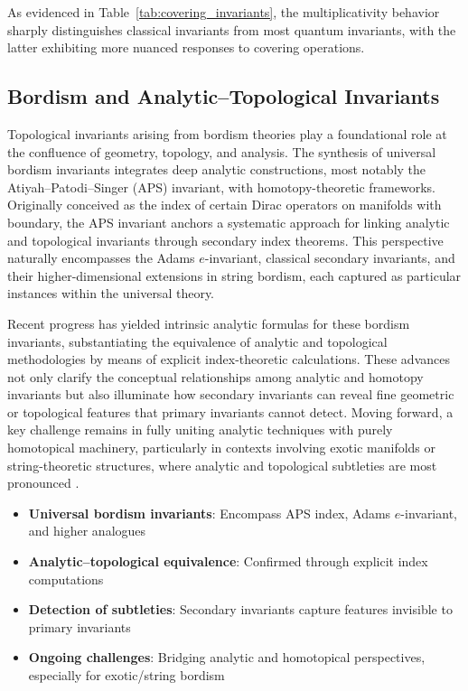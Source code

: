 As evidenced in Table~\ref{tab:covering_invariants}, the multiplicativity behavior sharply distinguishes classical invariants from most quantum invariants, with the latter exhibiting more nuanced responses to covering operations.

\subsection{Bordism and Analytic–Topological Invariants}

Topological invariants arising from bordism theories play a foundational role at the confluence of geometry, topology, and analysis. The synthesis of universal bordism invariants integrates deep analytic constructions, most notably the Atiyah–Patodi–Singer (APS) invariant, with homotopy-theoretic frameworks. Originally conceived as the index of certain Dirac operators on manifolds with boundary, the APS invariant anchors a systematic approach for linking analytic and topological invariants through secondary index theorems. This perspective naturally encompasses the Adams $e$-invariant, classical secondary invariants, and their higher-dimensional extensions in string bordism, each captured as particular instances within the universal theory.

Recent progress has yielded intrinsic analytic formulas for these bordism invariants, substantiating the equivalence of analytic and topological methodologies by means of explicit index-theoretic calculations. These advances not only clarify the conceptual relationships among analytic and homotopy invariants but also illuminate how secondary invariants can reveal fine geometric or topological features that primary invariants cannot detect. Moving forward, a key challenge remains in fully uniting analytic techniques with purely homotopical machinery, particularly in contexts involving exotic manifolds or string-theoretic structures, where analytic and topological subtleties are most pronounced \cite{ref82}.

\begin{itemize}
    \item \textbf{Universal bordism invariants}: Encompass APS index, Adams $e$-invariant, and higher analogues
    \item \textbf{Analytic–topological equivalence}: Confirmed through explicit index computations
    \item \textbf{Detection of subtleties}: Secondary invariants capture features invisible to primary invariants
    \item \textbf{Ongoing challenges}: Bridging analytic and homotopical perspectives, especially for exotic/string bordism
\end{itemize}

